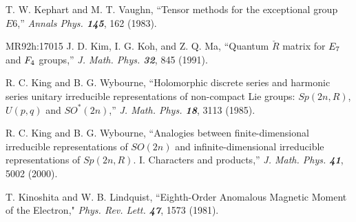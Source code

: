 T. W. Kephart and M. T. Vaughn,
``Tensor methods for the exceptional group $E6$,''
{\em Annals Phys.    \bf 145}, 162 (1983).



        {MR92h:17015}
J. D. Kim, I. G. Koh, and Z. Q. Ma,
``Quantum $\check R$ matrix for $E\sb 7$ and $F\sb 4$ groups,''
{\em J. Math. Phys.  \bf 32}, 845 (1991). %




 R. C. King and B. G. Wybourne,
    ``Holomorphic discrete series and harmonic series unitary
      irreducible representations of non-compact Lie groups:
      $Sp(2n,R)$, $U(p,q)$ and $SO^*(2n)$,''
    {\em J. Math. Phys. \bf 18}, 3113 (1985). %

 R. C. King and B. G. Wybourne,
``Analogies between finite-dimensional irreducible representations of
  $SO(2n)$ and infinite-dimensional irreducible representations of $Sp(2n,R)$.
  I. Characters and products,''
  {\em J. Math. Phys. \bf 41}, 5002 (2000).

%
%

 T. Kinoshita  and W. B. Lindquist,
        ``Eighth-Order Anomalous Magnetic Moment of the Electron,"
        {\em Phys. Rev. Lett.  \bf 47}, 1573  (1981). %

